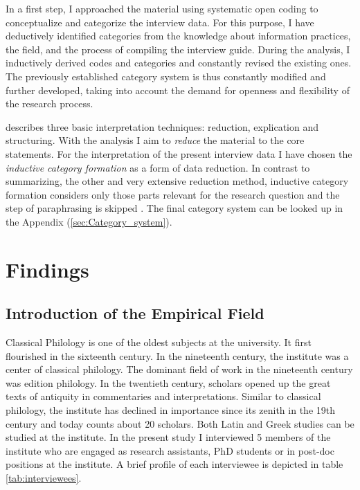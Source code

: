 \documentclass[12pt,a4paper,titlepage,oneside,abstract=true,toc=listof,toc=bibliography]{scrreprt}
\begin{document}
In a first step, I approached the material using systematic open coding \citep{Corbin1990} to conceptualize and categorize the interview data. For this purpose, I have deductively identified categories from the knowledge about information practices, the field, and the process of compiling the interview guide. During the analysis, I inductively derived codes and categories and constantly revised the existing ones. The previously established category system is thus constantly modified and further developed, taking into account the demand for openness and flexibility of the research process. 

\citet[p. 65]{Mayring2014} describes three basic interpretation techniques: reduction, explication and structuring. With the analysis I aim to \textit{reduce} the material to the core statements. For the interpretation of the present interview data I have chosen the \textit{inductive category formation} as a form of data reduction. In contrast to summarizing, the other and very extensive reduction method, inductive category formation considers only those parts relevant for the research question and the step of paraphrasing is skipped \cite[p. 79]{Mayring2014}. The final category system can be looked up in the Appendix (\ref{sec:Category_system}).
	
	
\chapter{Findings}

\section{Introduction of the Empirical Field}
Classical Philology is one of the oldest subjects at the university. It first flourished in the sixteenth century. In the nineteenth century, the institute was a center of classical philology. The dominant field of work in the nineteenth century was edition philology. In the twentieth century, scholars opened up the great texts of antiquity in commentaries and interpretations. Similar to classical philology, the institute has declined in importance since its zenith in the 19th century and today counts about 20 scholars. Both Latin and Greek studies can be studied at the institute.
In the present study I interviewed 5 members of the institute who are engaged as research assistants, PhD students or in post-doc positions at the institute. A brief profile of each interviewee is depicted in table \ref{tab:interviewees}. 
\end{document}
